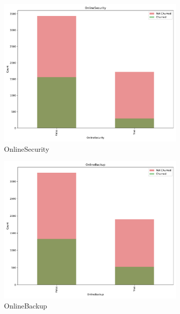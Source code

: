 \documentclass[a4paper,11pt]{article}
\begin{document}
\begin{landscape}
\begin{figure}
\begin{subfigure}{0.14\linewidth}
    \includegraphics[width=\linewidth]{figures/understanding/OnlineSecurity.pdf}
    \caption{OnlineSecurity}
\end{subfigure}
\begin{subfigure}{0.14\linewidth}
    \includegraphics[width=\linewidth]{figures/understanding/OnlineBackup.pdf}
    \caption{OnlineBackup}
\end{subfigure}
\begin{subfigure}{0.14\linewidth}

\end{subfigure}
\end{figure}
\end{landscape}
\end{document}
